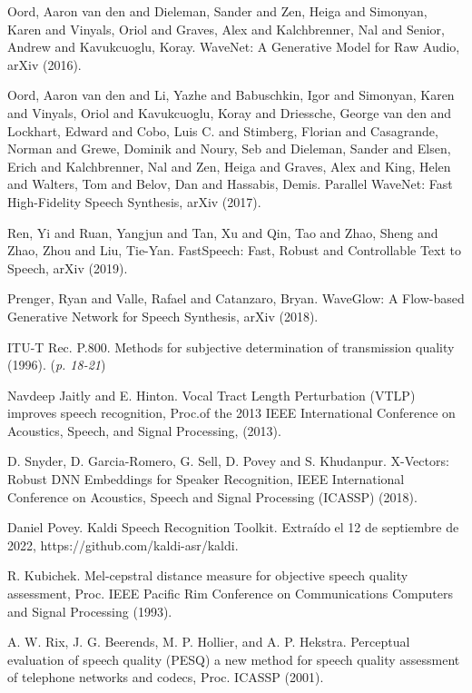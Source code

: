 

 Oord, Aaron van den and Dieleman, Sander and Zen, Heiga and Simonyan, Karen and Vinyals, Oriol and Graves, Alex and Kalchbrenner, Nal and Senior, Andrew and Kavukcuoglu, Koray. WaveNet: A Generative Model for Raw Audio, arXiv (2016).

 Oord, Aaron van den and Li, Yazhe and Babuschkin, Igor and Simonyan, Karen and Vinyals, Oriol and Kavukcuoglu, Koray and Driessche, George van den and Lockhart, Edward and Cobo, Luis C. and Stimberg, Florian and Casagrande, Norman and Grewe, Dominik and Noury, Seb and Dieleman, Sander and Elsen, Erich and Kalchbrenner, Nal and Zen, Heiga and Graves, Alex and King, Helen and Walters, Tom and Belov, Dan and Hassabis, Demis. Parallel WaveNet: Fast High-Fidelity Speech Synthesis, arXiv (2017).

 Ren, Yi and Ruan, Yangjun and Tan, Xu and Qin, Tao and Zhao, Sheng and Zhao, Zhou and Liu, Tie-Yan. FastSpeech: Fast, Robust and Controllable Text to Speech, arXiv (2019).

 Prenger, Ryan and Valle, Rafael and Catanzaro, Bryan. WaveGlow: A Flow-based Generative Network for Speech Synthesis, arXiv (2018).

 ITU-T Rec. P.800. Methods for subjective determination of transmission quality (1996). (\textit{p. 18-21})

Navdeep Jaitly and E. Hinton. Vocal Tract Length Perturbation (VTLP) improves speech recognition, Proc.of the 2013 IEEE International Conference on Acoustics, Speech, and Signal Processing, (2013). 

D. Snyder, D. Garcia-Romero, G. Sell, D. Povey and S. Khudanpur. X-Vectors: Robust DNN Embeddings for Speaker Recognition, IEEE International Conference on Acoustics, Speech and Signal Processing (ICASSP) (2018). 

Daniel Povey. Kaldi Speech Recognition Toolkit. Extraído el 12 de septiembre de 2022, https://github.com/kaldi-asr/kaldi. 

 R. Kubichek. Mel-cepstral distance measure for objective speech quality assessment, Proc. IEEE Pacific Rim Conference on Communications Computers and Signal Processing (1993). 

A. W. Rix, J. G. Beerends, M. P. Hollier, and A. P. Hekstra. Perceptual evaluation of speech quality (PESQ) a new method for speech quality assessment of telephone networks and codecs, Proc. ICASSP (2001).

